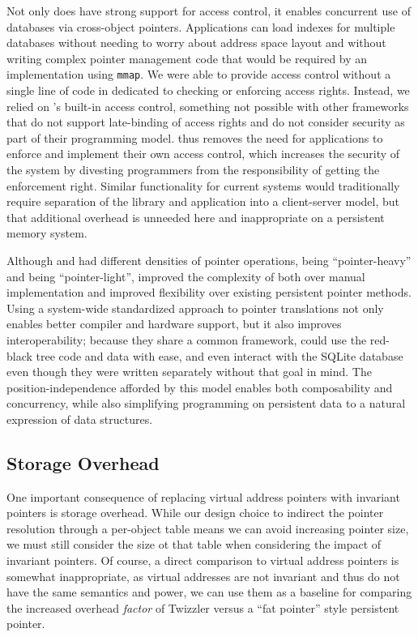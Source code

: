 Not only does \nvkv have strong support for access control, it enables
concurrent use of databases via cross-object pointers. Applications can load indexes
for multiple databases without needing to worry about address space layout and
without writing complex pointer management code that would be required by an
implementation using \texttt{mmap}.
We were able to provide access
control without a single line of code in \nvkv dedicated to checking or enforcing
access rights. Instead, we relied on \Twizzler's built-in access control, something not possible with other
frameworks that do not support late-binding of access rights and do not consider
security as part of their programming model. \Twizzler thus removes
the need for applications to enforce and implement their own access control, which
increases the security of the system by divesting programmers from
the responsibility of getting the enforcement right.
Similar functionality for current
systems would traditionally require separation of the library and application
into a client-server model, but that additional overhead is unneeded here and
inappropriate on a persistent memory system.

Although \nvrbt and \nvkv had different densities of pointer operations, \nvrbt being
``pointer-heavy'' and \nvkv being ``pointer-light'', \Twizzler improved the complexity of both
over manual implementation and improved flexibility over existing persistent
pointer methods. Using a system-wide standardized approach to
pointer translations not only enables better compiler and hardware support, but it also improves
interoperability; because they share a common framework, \nvkv could use the red-black tree code and data with ease, and even interact with
the SQLite database even though they were written separately without that goal in mind.
The position-independence afforded by this model
enables both composability and concurrency, while also simplifying programming on persistent data to
a natural expression of data structures.


\subsection{Storage Overhead}

One important consequence of replacing virtual address pointers with invariant pointers is storage
overhead. While our design choice to indirect the pointer resolution through a per-object table
means we can avoid increasing pointer size, we must still consider the size ot that table when
considering the impact of invariant pointers. Of course, a direct comparison to virtual address
pointers is somewhat inappropriate, as virtual addresses are not invariant and thus do not have the
same semantics and power, we can use them as a baseline for comparing the increased overhead
\emph{factor} of Twizzler versus a ``fat pointer'' style persistent pointer.

